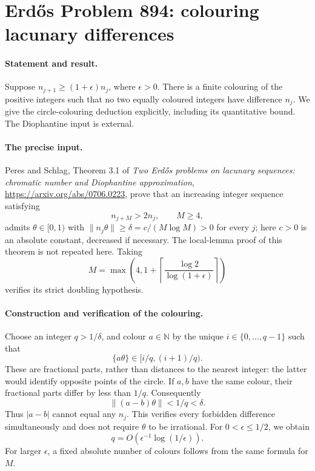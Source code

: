 \section*{Erd\H{o}s Problem 894: colouring lacunary differences}

\paragraph{Statement and result.}
Suppose \(n_{j+1}\geq(1+\epsilon)n_j\), where \(\epsilon>0\).
There is a finite colouring of the positive integers such that
no two equally coloured integers have difference \(n_j\).
We give the circle-colouring deduction explicitly, including its
quantitative bound. The Diophantine input is external.

\paragraph{The precise input.}
Peres and Schlag, Theorem 3.1 of
\emph{Two Erd\H{o}s problems on lacunary sequences: chromatic number
and Diophantine approximation},
\url{https://arxiv.org/abs/0706.0223}, prove that an increasing
integer sequence satisfying
\[
 n_{j+M}>2n_j,\qquad M\geq4,
\]
admits \(\theta\in[0,1)\) with
\(\|n_j\theta\|\geq\delta=c/(M\log M)>0\) for every \(j\);
here \(c>0\) is an absolute constant, decreased if necessary.
The local-lemma proof of this theorem is not repeated here.
Taking
\[
 M=\max\left(4,1+\left\lceil
                  \frac{\log2}{\log(1+\epsilon)}\right\rceil\right)
\]
verifies its strict doubling hypothesis.

\paragraph{Construction and verification of the colouring.}
Choose an integer \(q>1/\delta\), and colour \(a\in\mathbb N\)
by the unique \(i\in\{0,\ldots,q-1\}\) such that
\[
 \{a\theta\}\in[i/q,(i+1)/q).
\]
These are fractional parts, rather than distances to the nearest
integer: the latter would identify opposite points of the circle.
If \(a,b\) have the same colour, their fractional parts differ
by less than \(1/q\). Consequently
\[
 \|(a-b)\theta\|<1/q<\delta.
\]
Thus \(|a-b|\) cannot equal any \(n_j\).
This verifies every forbidden difference simultaneously and
does not require \(\theta\) to be irrational.
For \(0<\epsilon\leq1/2\), we obtain
\[
 q=O\!\left(\epsilon^{-1}\log(1/\epsilon)\right).
\]
For larger \(\epsilon\), a fixed absolute number of colours
follows from the same formula for \(M\).


